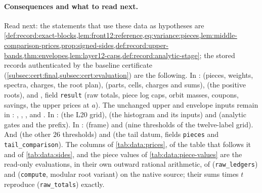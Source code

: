 \paragraph{Consequences and what to read next.}
Read next: the statements that use these data as hypotheses are
\cref{def:record:exact-blocks,lem:front12:reference,eq:variance:pieces,lem:middle-comparison-prices,prop:signed-sides,def:record:upper-bands,thm:envelopes,lem:layer12-caps,def:record:analytic-stage};
the stored records authenticated by the baseline certificate
(\cref{subsec:cert:final,subsec:cert:evaluation}) are the
following. In
: 
(pieces, weights, spectra, charges, the root plan),
 (parts, cells, charges and sums),
 (the positive roots), and
, field \texttt{result} (raw totals, piece log caps,
orbit masses, coupons, savings, the upper prices at $a$).
The unchanged upper and envelope inputs remain in
: ,
, ,
 and
.
In :
 (the L20 grid),
 (the histogram and its inputs) and
 (analytic gates and the prefix). In
: 
(frame) and  (nine thresholds of the
twelve-label grid). And 
(the other $26$ thresholds) and
 (the tail datum,
fields \texttt{pieces} and \texttt{tail\_comparison}). The columns of
\cref{tab:data:prices}, of the table that follows it and of \cref{tab:data:sides},
and the piece values of
\cref{tab:data:piece-values} are the read-only evaluations, in their own outward
rational arithmetic, of 
(\texttt{raw\_ledgers}) and 
(\texttt{compute}, modular root variant) on the native source; their sums times
$t$ reproduce  (\texttt{raw\_totals}) exactly.
